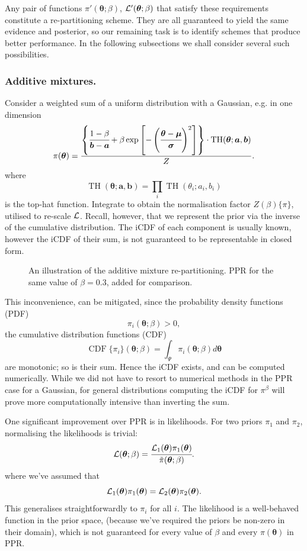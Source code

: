 \documentclass[usenatbib]{mnras}
\DeclareMathOperator{\TopHat}{TH}
\DeclareMathOperator{\CDF}{CDF}
\begin{document}
Any pair of functions \(\pi'(\bm{\theta}; \beta)\), \({\cal L}'(\bm{\theta};
   \beta)\) that satisfy these requirements constitute a
re-partitioning scheme. They are all guaranteed to yield the same
evidence and posterior, so our remaining task is to identify
schemes that produce better performance. In the following subsections
we shall consider several such possibilities.

\subsubsection{Additive mixtures.}
\label{sec:orge501742}
Consider a weighted sum of a uniform distribution with
a Gaussian, e.g. in one dimension
\begin{equation}\label{eq:additive-mix}
  \pi(\bm{\theta}) = \frac{ \left\lbrace \cfrac{1- \beta} {\bm{b} - \bm{a}} + \beta \exp \left[ -\left(\cfrac{\bm{\theta} - \bm{\mu}}{\bm{\sigma}} \right)^{2}\right]\right\rbrace \cdot \TopHat(\bm{\theta}; \bm{a}, \bm{b})}{Z}.
\end{equation}
where \[\TopHat(\bm{\theta};\bm{a},\bm{b}) = \prod_{i}
	\TopHat(\theta_{i}; a_{i}, b_{i})\] is the top-hat function. Integrate
to obtain the normalisation factor \(Z(\beta)\{\pi\}\), utilised
to re-scale \({\cal L}\). Recall, however, that we represent the
prior via the inverse of the cumulative distribution. The iCDF of
each component is usually known, however the iCDF of their sum, is
not guaranteed to be representable in closed form.

\begin{figure}
  
\caption{\label{org6abea33}
An illustration of the additive mixture re-partitioning. PPR for the same value of \(\beta=0.3\), added for comparison.}
\end{figure}

This inconvenience, can be mitigated, since the probability
density functions (PDF) \[\pi_{i}(\bm{\theta}; \beta) >0,\] the
cumulative distribution functions (CDF)
\[\CDF\{\pi_{i}\}(\bm{\theta};\beta) = \int_{\Psi}
	\pi_{i}(\bm{\theta}; \beta)d\bm{\theta}\] are monotonic;
so is their sum. Hence the iCDF exists, and can be computed
numerically. While we did not have to resort to numerical methods
in the PPR case for a Gaussian, for general distributions
computing the iCDF for \(\pi^{\beta}\) will prove more
computationally intensive than inverting the sum.

One significant improvement over PPR is in likelihoods. For two
priors \(\pi_{1}\) and \(\pi_{2}\), normalising the likelihoods is
trivial:
\begin{equation*}
{\cal L}(\bm{\theta}; \beta) = \cfrac{{\cal L}_{1}(\bm{\theta}) \pi_{1}(\bm{\theta})}{\tilde{\pi}(\bm{\theta}; \beta)}.
\end{equation*}
where we've assumed that \[{\cal L}_{1}(\bm{\theta})\pi_{1}(\bm{\theta})
	={\cal L}_{2}(\bm{\theta}) \pi_{2}(\bm{\theta}).\] This generalises
straightforwardly to \(\pi_{i}\) for all \(i\). The likelihood is a
well-behaved function in the prior space, (because we've required
the priors be non-zero in their domain), which is not guaranteed
for every value of \(\beta\) and every \(\pi(\bm{\theta})\) in PPR.
\end{document}
